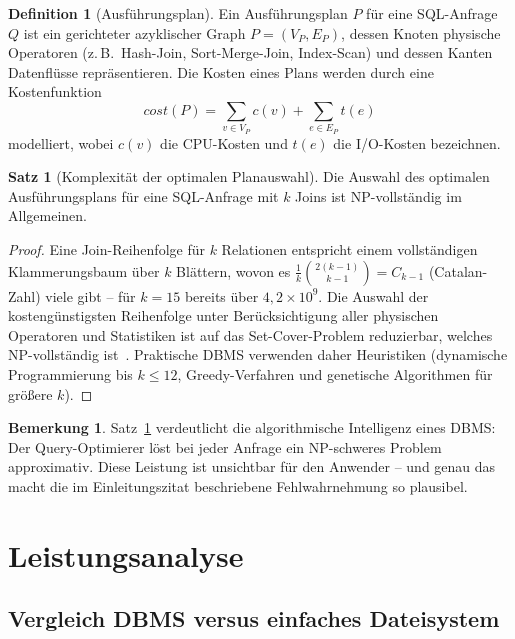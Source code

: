 ﻿\documentclass[a4paper,12pt]{article}
\theoremstyle{definition}
\newtheorem{definition}{Definition}
\newtheorem{satz}{Satz}
\newtheorem{bemerkung}{Bemerkung}
\begin{document}
\begin{definition}[Ausführungsplan]
\label{def:plan}
Ein Ausführungsplan $P$ für eine SQL-Anfrage $Q$ ist ein gerichteter azyklischer Graph $P = (V_P, E_P)$, dessen Knoten physische Operatoren (z.\,B.\ Hash-Join, Sort-Merge-Join, Index-Scan) und dessen Kanten Datenflüsse repräsentieren. Die Kosten eines Plans werden durch eine Kostenfunktion
\[
\mathit{cost}(P) = \sum_{v \in V_P} c(v) + \sum_{e \in E_P} t(e)
\]
modelliert, wobei $c(v)$ die CPU-Kosten und $t(e)$ die I/O-Kosten bezeichnen.
\end{definition}

\begin{satz}[Komplexität der optimalen Planauswahl]
\label{satz:optimierung}
Die Auswahl des optimalen Ausführungsplans für eine SQL-Anfrage mit $k$ Joins ist NP-vollständig im Allgemeinen.
\end{satz}

\begin{proof}
Eine Join-Reihenfolge für $k$ Relationen entspricht einem vollständigen Klammerungsbaum über $k$ Blättern, wovon es $\frac{1}{k} \binom{2(k-1)}{k-1} = C_{k-1}$ (Catalan-Zahl) viele gibt -- für $k = 15$ bereits über $4{,}2 \times 10^9$. Die Auswahl der kostengünstigsten Reihenfolge unter Berücksichtigung aller physischen Operatoren und Statistiken ist auf das Set-Cover-Problem reduzierbar, welches NP-vollständig ist~\cite{ibaraki1984}. Praktische DBMS verwenden daher Heuristiken (dynamische Programmierung bis $k \leq 12$, Greedy-Verfahren und genetische Algorithmen für größere $k$).
\end{proof}

\begin{bemerkung}
Satz~\ref{satz:optimierung} verdeutlicht die algorithmische Intelligenz eines DBMS: Der Query-Optimierer löst bei jeder Anfrage ein NP-schweres Problem approximativ. Diese Leistung ist unsichtbar für den Anwender -- und genau das macht die im Einleitungszitat beschriebene Fehlwahrnehmung so plausibel.
\end{bemerkung}

\section{Leistungsanalyse}
\label{sec:analyse}

\subsection{Vergleich DBMS versus einfaches Dateisystem}
\end{document}
